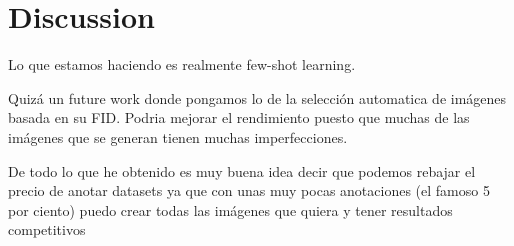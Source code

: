 \chapter{Discussion} \label{sec:discussion}

Lo que estamos haciendo es realmente few-shot learning.


Quizá un future work donde pongamos  lo de la selección automatica de imágenes basada en su FID. Podria mejorar el rendimiento puesto que muchas de las imágenes que se generan tienen muchas imperfecciones.

De todo lo que he obtenido es muy buena idea decir que podemos rebajar el precio de anotar datasets ya que con unas muy pocas anotaciones (el famoso 5 por ciento) puedo crear todas las imágenes que quiera y tener resultados competitivos